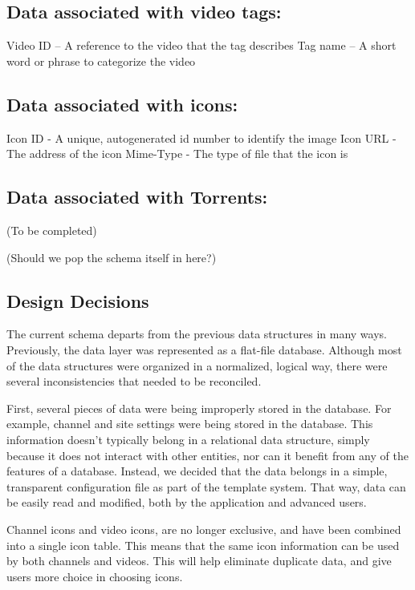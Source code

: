 \documentclass[a4paper,12pt]{report}
\begin{document}
\subsection{Data associated with video tags:}
    Video ID – A reference to the video that the tag describes
    Tag name – A short word or phrase to categorize the video

\subsection{Data associated with icons:}
    Icon ID - A unique, autogenerated id number to identify the image
    Icon URL - The address of the icon
    Mime-Type - The type of file that the icon is


\subsection{Data associated with Torrents:}
(To be completed)

(Should we pop the schema itself in here?)

\subsection{Design Decisions}
The current schema departs from the previous data structures in many ways.
Previously, the data layer was represented as a flat-file database.
Although most of the data structures were organized in a normalized, logical way, there were several inconsistencies that needed to be reconciled.

First, several pieces of data were being improperly stored in the database. 
For example, channel and site settings were being stored in the database. 
This information doesn't typically belong in a relational data structure, simply because it does not interact with other entities, nor can it benefit from any of the features of a database. 
Instead, we decided that the data belongs in a simple, transparent configuration file as part of the template system. 
That way, data can be easily read and modified, both by the application and advanced users. 

Channel icons and video icons, are no longer exclusive, and have been combined into a single icon table.
This means that the same icon information can be used by both channels and videos. This will help eliminate duplicate data, and give users more choice in choosing icons.
\end{document}
